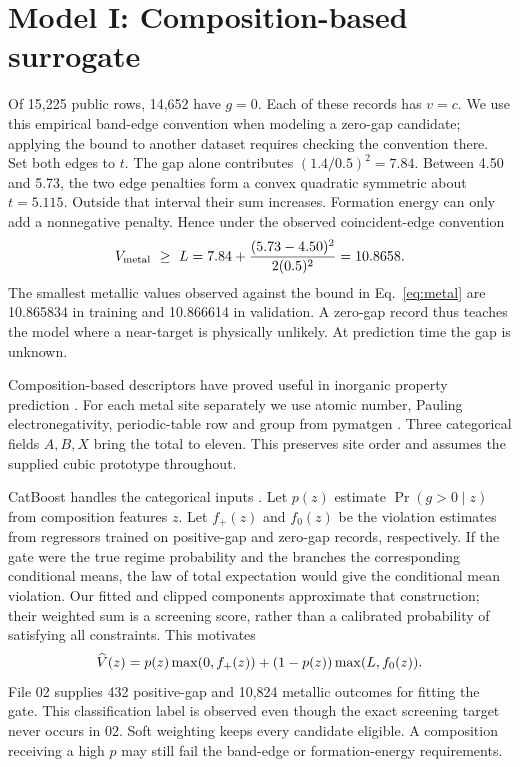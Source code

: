 \section{Model I: Composition-based surrogate}
Of 15,225 public rows, 14,652 have $g=0$. Each of these records has $v=c$. We use this empirical band-edge convention when modeling a zero-gap candidate; applying the bound to another dataset requires checking the convention there. Set both edges to $t$. The gap alone contributes $(1.4/0.5)^2=7.84$. Between 4.50 and 5.73, the two edge penalties form a convex quadratic symmetric about $t=5.115$. Outside that interval their sum increases. Formation energy can only add a nonnegative penalty. Hence under the observed coincident-edge convention
\begin{equation}
 V_{\rm metal}\ \geq\ L=7.84+
 \frac{(5.73-4.50)^2}{2(0.5)^2}=10.8658. \label{eq:metal}
\end{equation}
The smallest metallic values observed against the bound in Eq.~\eqref{eq:metal} are 10.865834 in training and 10.866614 in validation. A zero-gap record thus teaches the model where a near-target is physically unlikely. At prediction time the gap is unknown.



Composition-based descriptors have proved useful in inorganic property prediction \cite{ward}. For each metal site separately we use atomic number, Pauling electronegativity, periodic-table row and group from pymatgen \cite{ong}. Three categorical fields $A,B,X$ bring the total to eleven. This preserves site order and assumes the supplied cubic prototype throughout.

CatBoost handles the categorical inputs \cite{catboost}. Let $p(z)$ estimate $\Pr(g>0\mid z)$ from composition features $z$. Let $f_+(z)$ and $f_0(z)$ be the violation estimates from regressors trained on positive-gap and zero-gap records, respectively. If the gate were the true regime probability and the branches the corresponding conditional means, the law of total expectation would give the conditional mean violation. Our fitted and clipped components approximate that construction; their weighted sum is a screening score, rather than a calibrated probability of satisfying all constraints. This motivates
\begin{equation}
 \widehat V(z)=p(z)\max(0,f_+(z)) + (1-p(z))\max(L,f_0(z)).
 \label{eq:mix}
\end{equation}
File 02 supplies 432 positive-gap and 10,824 metallic outcomes for fitting the gate. This classification label is observed even though the exact screening target never occurs in 02. Soft weighting keeps every candidate eligible. A composition receiving a high $p$ may still fail the band-edge or formation-energy requirements.

